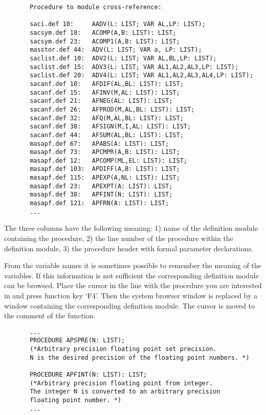 \begin{verbatim}
       Procedure to module cross-reference:

       saci.def 10:     AADV(L: LIST; VAR AL,LP: LIST);
       sacsym.def 18:   ACOMP(A,B: LIST): LIST;
       sacsym.def 23:   ACOMP1(A,B: LIST): LIST;
       masstor.def 44:  ADV(L: LIST; VAR a, LP: LIST);
       saclist.def 10:  ADV2(L: LIST; VAR AL,BL,LP: LIST);
       saclist.def 15:  ADV3(L: LIST; VAR AL1,AL2,AL3,LP: LIST);
       saclist.def 20:  ADV4(L: LIST; VAR AL1,AL2,AL3,AL4,LP: LIST);
       sacanf.def 10:   AFDIF(AL,BL: LIST): LIST;
       sacanf.def 15:   AFINV(M,AL: LIST): LIST;
       sacanf.def 21:   AFNEG(AL: LIST): LIST;
       sacanf.def 26:   AFPROD(M,AL,BL: LIST): LIST;
       sacanf.def 32:   AFQ(M,AL,BL: LIST): LIST;
       sacanf.def 38:   AFSIGN(M,I,AL: LIST): LIST;
       sacanf.def 44:   AFSUM(AL,BL: LIST): LIST; 
       masapf.def 67:   APABS(A: LIST): LIST; 
       masapf.def 73:   APCMPR(A,B: LIST): LIST;
       masapf.def 12:   APCOMP(ML,EL: LIST): LIST;
       masapf.def 103:  APDIFF(A,B: LIST): LIST;
       masapf.def 115:  APEXP(A,NL: LIST): LIST;
       masapf.def 23:   APEXPT(A: LIST): LIST;
       masapf.def 38:   APFINT(N: LIST): LIST;
       masapf.def 121:  APFRN(A: LIST): LIST;
       ...
\end{verbatim}

The three columns have the following meaning:
1) name of the definition module containing the procedure,
2) the line number of the procedure within the definition module,
3) the procedure header with formal parameter declarations.

From the variable names it is sometimes possible to remember 
the meaning of the variables. If this information is not
sufficient the corresponding definition module can be
browsed.
Place the cursor in the line with the procedure 
you are interested in and press function key `F4'.
Then the system browser window is replaced by a window 
containing the corresponding definition module.
The cursor is moved to the comment of the function. 

\begin{verbatim}
       ...
       PROCEDURE APSPRE(N: LIST);
       (*Arbitrary precision floating point set precision.
       N is the desired precision of the floating point numbers. *)

       PROCEDURE APFINT(N: LIST): LIST;
       (*Arbitrary precision floating point from integer.
       The integer N is converted to an arbitrary precision
       floating point number. *)
       ...
\end{verbatim}

